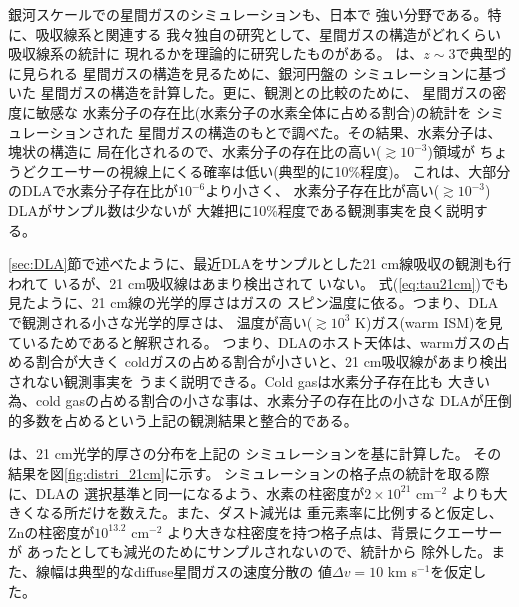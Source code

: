 銀河スケールでの星間ガスのシミュレーションも、日本で
強い分野である。特に、吸収線系と関連する
我々独自の研究として、星間ガスの構造がどれくらい吸収線系の統計に
現れるかを理論的に研究したものがある。
\citet{2003MNRAS.341L..18H}は、$z\sim 3$で典型的に見られる
星間ガスの構造を見るために、銀河円盤の
シミュレーション\citep{2001ApJ...547..172W}に基づいた
星間ガスの構造を計算した。更に、観測との比較のために、
星間ガスの密度に敏感な
水素分子の存在比(水素分子の水素全体に占める割合)の統計を
シミュレーションされた
星間ガスの構造のもとで調べた。その結果、水素分子は、塊状の構造に
局在化されるので、水素分子の存在比の高い($\gtrsim 10^{-3}$)領域が
ちょうどクエーサーの視線上にくる確率は低い(典型的に10\%程度)。
これは、大部分のDLAで水素分子存在比が$10^{-6}$より小さく、
水素分子存在比が高い($\gtrsim 10^{-3}$) DLAがサンプル数は少ないが
大雑把に10\%程度である観測事実\citep{2003MNRAS.346..209L}を良く説明する。

\ref{sec:DLA}節で述べたように、最近DLAをサンプルとした21 cm線吸収の観測も行われて
いるが、21 cm吸収線はあまり検出されて
いない\citep{2012MNRAS.421..651S,2014MNRAS.438.2131K}。
式(\ref{eq:tau21cm})でも見たように、21 cm線の光学的厚さはガスの
スピン温度に依る。つまり、DLAで観測される小さな光学的厚さは、
温度が高い($\gtrsim 10^3$ K)ガス(warm ISM)を見ているためであると解釈される。
つまり、DLAのホスト天体は、warmガスの占める割合が大きく
coldガスの占める割合が小さいと、21 cm吸収線があまり検出されない観測事実を
うまく説明できる。Cold gasは水素分子存在比も
大きい為、cold gasの占める割合の小さな事は、水素分子の存在比の小さな
DLAが圧倒的多数を占めるという上記の観測結果と整合的である。

\citet{tee15}は、21 cm光学的厚さの分布を上記の
シミュレーション\citep{2003MNRAS.341L..18H}を基に計算した。
その結果を図\ref{fig:distri_21cm}に示す。
シミュレーションの格子点の統計を取る際に、DLAの
選択基準と同一になるよう、水素の柱密度が$2\times 10^{21}$ cm$^{-2}$
よりも大きくなる所だけを数えた。また、ダスト減光は
重元素率に比例すると仮定し、Znの柱密度が$10^{13.2}$ cm$^{-2}$
より大きな柱密度を持つ格子点は、背景にクエーサーが
あったとしても減光のためにサンプルされない\citep{2005A&A...444..461V}ので、統計から
除外した。また、線幅は典型的なdiffuse星間ガスの速度分散の
値$\Delta v=10$ km s$^{-1}$を仮定した\citep{2009ApJ...695..937B}。

